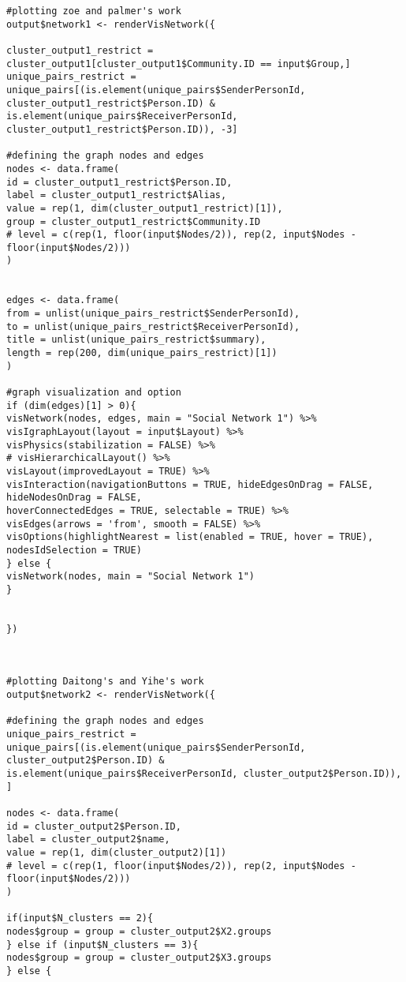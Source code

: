 \begin{verbatim}
#plotting zoe and palmer's work
output$network1 <- renderVisNetwork({

cluster_output1_restrict = cluster_output1[cluster_output1$Community.ID == input$Group,]
unique_pairs_restrict = unique_pairs[(is.element(unique_pairs$SenderPersonId, cluster_output1_restrict$Person.ID) & 
is.element(unique_pairs$ReceiverPersonId, cluster_output1_restrict$Person.ID)), -3]

#defining the graph nodes and edges
nodes <- data.frame(
id = cluster_output1_restrict$Person.ID, 
label = cluster_output1_restrict$Alias,
value = rep(1, dim(cluster_output1_restrict)[1]),
group = cluster_output1_restrict$Community.ID
# level = c(rep(1, floor(input$Nodes/2)), rep(2, input$Nodes - floor(input$Nodes/2)))
)


edges <- data.frame(
from = unlist(unique_pairs_restrict$SenderPersonId),
to = unlist(unique_pairs_restrict$ReceiverPersonId), 
title = unlist(unique_pairs_restrict$summary),
length = rep(200, dim(unique_pairs_restrict)[1])
)

#graph visualization and option
if (dim(edges)[1] > 0){
visNetwork(nodes, edges, main = "Social Network 1") %>%
visIgraphLayout(layout = input$Layout) %>%
visPhysics(stabilization = FALSE) %>%
# visHierarchicalLayout() %>%
visLayout(improvedLayout = TRUE) %>%
visInteraction(navigationButtons = TRUE, hideEdgesOnDrag = FALSE, hideNodesOnDrag = FALSE,
hoverConnectedEdges = TRUE, selectable = TRUE) %>%
visEdges(arrows = 'from', smooth = FALSE) %>%
visOptions(highlightNearest = list(enabled = TRUE, hover = TRUE), nodesIdSelection = TRUE)
} else {
visNetwork(nodes, main = "Social Network 1")
}


})



#plotting Daitong's and Yihe's work
output$network2 <- renderVisNetwork({

#defining the graph nodes and edges
unique_pairs_restrict = unique_pairs[(is.element(unique_pairs$SenderPersonId, cluster_output2$Person.ID) & 
is.element(unique_pairs$ReceiverPersonId, cluster_output2$Person.ID)), ]

nodes <- data.frame(
id = cluster_output2$Person.ID, 
label = cluster_output2$name,
value = rep(1, dim(cluster_output2)[1])
# level = c(rep(1, floor(input$Nodes/2)), rep(2, input$Nodes - floor(input$Nodes/2)))
)

if(input$N_clusters == 2){
nodes$group = group = cluster_output2$X2.groups
} else if (input$N_clusters == 3){
nodes$group = group = cluster_output2$X3.groups
} else {


\end{verbatim}
